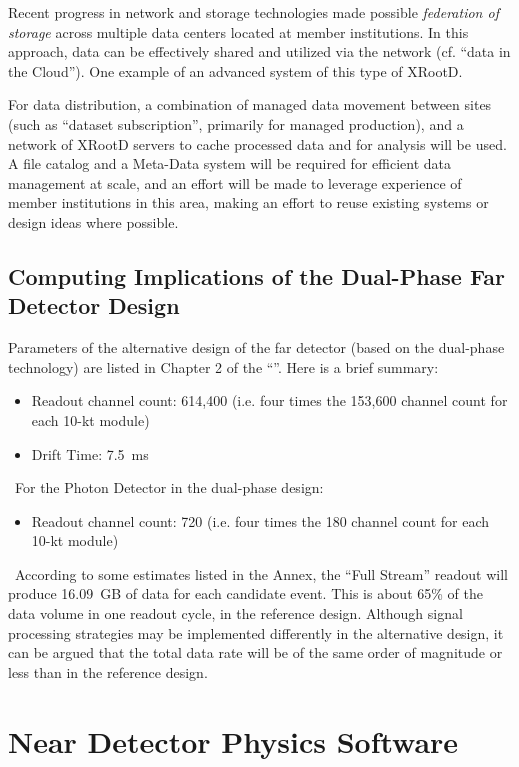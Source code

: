 Recent progress in network and storage technologies made possible
\textit{federation of storage} across multiple data centers located at
member institutions. In this approach, data can be effectively shared
and utilized via the network (cf. ``data in the Cloud''). One example
of an advanced system of this type of XRootD.

For data distribution, a combination of managed data movement between
sites (such as ``dataset subscription'', primarily for managed
production), and a network of XRootD servers to cache processed data
and for analysis will be used.  A file catalog and a Meta-Data system
will be required for efficient data management at scale, and an effort
will be made to leverage experience of member institutions in this
area, making an effort to reuse existing systems or design ideas where
possible.

\subsection{Computing Implications of the Dual-Phase Far Detector Design}
\label{sec:detectors-sc-alternate}
Parameters of the alternative design of the far detector (based on the
dual-phase technology) are listed in Chapter 2 of the
``\anxrates''. Here is a brief summary:
\begin{itemize}
	\item Readout channel count: 614,400 (i.e. four times the
          153,600 channel count for each 10-kt module)
	\item Drift Time: 7.5~ms
\end{itemize}
\
For the Photon Detector in the dual-phase design:
\begin{itemize}
	\item Readout channel count: 720 (i.e. four times the 180
          channel count for each 10-kt module)
\end{itemize}
\ According to some estimates listed in the Annex, the ``Full Stream''
readout will produce 16.09~GB of data for each candidate event. This is
about 65\% of the data volume in one readout cycle, in the reference
design.  Although signal processing strategies may be implemented
differently in the alternative design, it can be argued that the total
data rate will be of the same order of magnitude or less than in the
reference design.

\section{Near Detector Physics Software}
\label{sec:detectors-sc-nd-physics-software}

